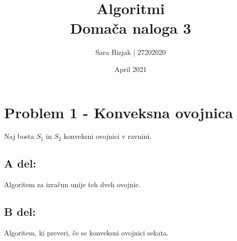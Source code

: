 \documentclass[a4paper,11pt]{article}
\title{Algoritmi \\
\textbf{Domača naloga 3} }
\author{Sara Bizjak  |  27202020}
\date{April 2021}
\begin{document}
\maketitle


\section*{Problem 1 - Konveksna ovojnica}

\noindent
Naj bosta $S_1$ in $S_2$ konveksni ovojnici v ravnini. 

\subsection*{A del:} Algoritem za izračun unije teh dveh ovojnic.

\subsection*{B del:} Algoritem, ki preveri, če se konveksni ovojnici sekata.



\end{document}
